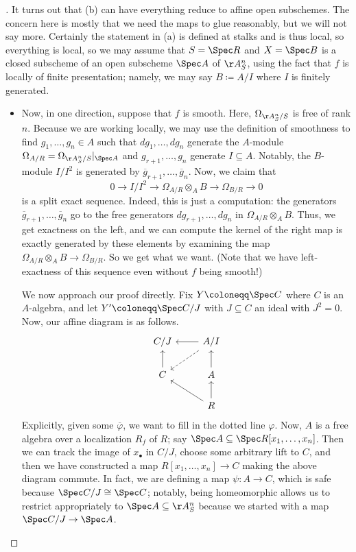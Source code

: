 \documentclass[../notes.tex]{subfiles}
\begin{document}
\begin{proof}[]
	It turns out that (b) can have everything reduce to affine open subschemes. The concern here is mostly that we need the maps to glue reasonably, but we will not say more. Certainly the statement in (a) is defined at stalks and is thus local, so everything is local, so we may assume that $S=\Spec R$ and $X=\Spec B$ is a closed subscheme of an open subscheme $\Spec A$ of $\AA^n_S$, using the fact that $f$ is locally of finite presentation; namely, we may say $B\coloneqq A/I$ where $I$ is finitely generated.
	\begin{itemize}
		\item Now, in one direction, suppose that $f$ is smooth. Here, $\Omega_{\AA^n_S/S}$ is free of rank $n$. Because we are working locally, we may use the definition of smoothness to find $g_1,\ldots,g_n\in A$ such that $dg_1,\ldots,dg_n$ generate the $A$-module $\Omega_{A/R}=\Omega_{\AA^n_S/S}|_{\Spec A}$ and $g_{r+1},\ldots,g_n$ generate $I\subseteq A$. Notably, the $B$-module $I/I^2$ is generated by $\overline g_{r+1},\ldots,\overline g_n$. Now, we claim that
		\[0\to I/I^2\to\Omega_{A/R}\otimes_AB\to\Omega_{B/R}\to0\]
		is a split exact sequence. Indeed, this is just a computation: the generators $\overline g_{r+1},\ldots,\overline g_n$ go to the free generators $dg_{r+1},\ldots,dg_n$ in $\Omega_{A/R}\otimes_AB$. Thus, we get exactness on the left, and we can compute the kernel of the right map is exactly generated by these elements by examining the map $\Omega_{A/R}\otimes_AB\to\Omega_{B/R}$. So we get what we want. (Note that we have left-exactness of this sequence even without $f$ being smooth!)
	
		We now approach our proof directly. Fix $Y\coloneqq\Spec C$ where $C$ is an $A$-algebra, and let $Y'\coloneqq\Spec C/J$ with $J\subseteq C$ an ideal with $J^2=0$. Now, our affine diagram is as follows.
		\[\begin{tikzcd}
			{C/J} & {A/I} \\
			C & A \\
			& R
			\arrow[from=3-2, to=2-1]
			\arrow[from=3-2, to=2-2]
			\arrow[from=2-2, to=1-2]
			\arrow[from=1-2, to=1-1]
			\arrow[from=2-1, to=1-1]
			\arrow[dashed, from=1-2, to=2-1]
		\end{tikzcd}\]
		Explicitly, given some $\overline\varphi$, we want to fill in the dotted line $\varphi$. Now, $A$ is a free algebra over a localization $R_f$ of $R$; say $\Spec A\subseteq\Spec R[x_1,\ldots,x_n]$. Then we can track the image of $x_\bullet$ in $C/J$, choose some arbitrary lift to $C$, and then we have constructed a map $R[x_1,\ldots,x_n]\to C$ making the above diagram commute. In fact, we are defining a map $\psi\colon A\to C$, which is safe because $\Spec C/J\cong\Spec C$; notably, being homeomorphic allows us to restrict appropriately to $\Spec A\subseteq\AA^n_S$ because we started with a map $\Spec C/J\to\Spec A$.
	

\end{itemize}
\end{proof}
\end{document}
